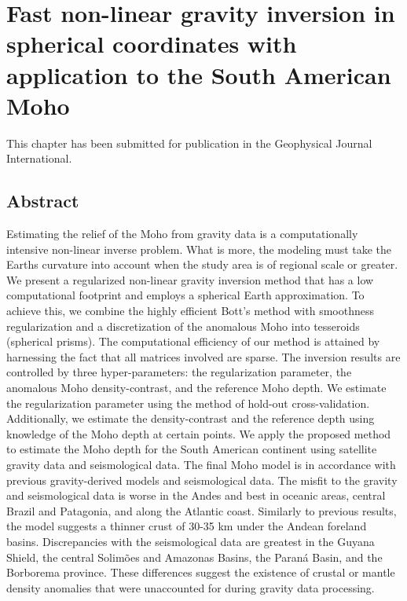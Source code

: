 \chapter{Fast non-linear gravity inversion in spherical coordinates with
         application to the South American Moho}
\label{chap:moho}

This chapter has been submitted for publication in the Geophysical Journal
International.

\section{Abstract}

Estimating the relief of the Moho from gravity data is a computationally
intensive non-linear inverse problem.  What is more, the modeling must take the
Earths curvature into account when the study area is of regional scale or
greater.  We present a regularized non-linear gravity inversion method that has
a low computational footprint and employs a spherical Earth approximation.  To
achieve this, we combine the highly efficient Bott's method with smoothness
regularization and a discretization of the anomalous Moho into tesseroids
(spherical prisms).  The computational efficiency of our method is attained by
harnessing the fact that all matrices involved are sparse.  The inversion
results are controlled by three hyper-parameters: the regularization parameter,
the anomalous Moho density-contrast, and the reference Moho depth.  We estimate
the regularization parameter using the method of hold-out cross-validation.
Additionally, we estimate the density-contrast and the reference depth using
knowledge of the Moho depth at certain points.  We apply the proposed method to
estimate the Moho depth for the South American continent using satellite
gravity data and seismological data.  The final Moho model is in accordance
with previous gravity-derived models and seismological data.  The misfit to the
gravity and seismological data is worse in the Andes and best in oceanic areas,
central Brazil and Patagonia, and along the Atlantic coast.  Similarly to
previous results, the model suggests a thinner crust of 30-35 km under the
Andean foreland basins.  Discrepancies with the seismological data are greatest
in the Guyana Shield, the central Solimões and Amazonas Basins, the Paraná
Basin, and the Borborema province.  These differences suggest the existence of
crustal or mantle density anomalies that were unaccounted for during gravity
data processing.


